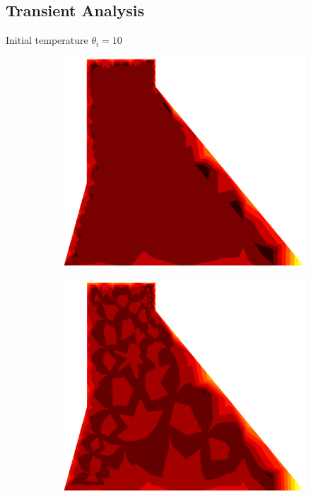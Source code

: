 \documentclass[10pt, a4paper]{article}
\begin{document}
\subsection{Transient Analysis}

Initial temperature $\theta_i = 10$

\begin{figure}[H]
\centering
	\begin{subfigure}[H]{0.19\textwidth}
		\includegraphics[width=1.2\textwidth]{fig/0.eps}
	\end{subfigure}
	\begin{subfigure}[H]{0.19\textwidth}
		\includegraphics[width=1.2\textwidth]{fig/1.eps}

\end{subfigure}
\end{figure}
\end{document}
